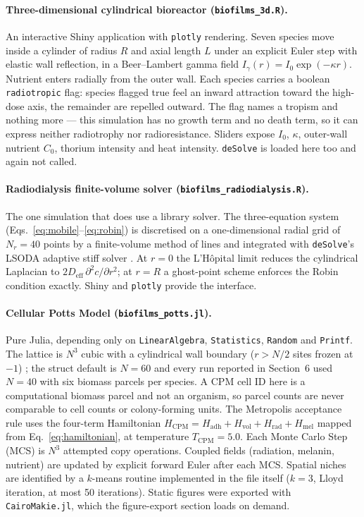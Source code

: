 \documentclass[11pt]{article}
\begin{document}
\paragraph{Three-dimensional cylindrical bioreactor (\texttt{biofilms\_3d.R}).}
An interactive Shiny application with \texttt{plotly} rendering. Seven species move inside a
cylinder of radius $R$ and axial length $L$ under an explicit Euler step with elastic wall
reflection, in a Beer--Lambert gamma field $I_\gamma(r) = I_0\exp(-\kappa r)$. Nutrient enters
radially from the outer wall. Each species carries a boolean \texttt{radiotropic} flag: species
flagged true feel an inward attraction toward the high-dose axis, the remainder are repelled
outward. The flag names a tropism and nothing more --- this simulation has no growth term and no
death term, so it can express neither radiotrophy nor radioresistance. Sliders expose $I_0$,
$\kappa$, outer-wall nutrient $C_0$, thorium intensity and heat intensity. \texttt{deSolve} is
loaded here too and again not called.

\paragraph{Radiodialysis finite-volume solver (\texttt{biofilms\_radiodialysis.R}).}
The one simulation that does use a library solver. The three-equation system
(Eqs.~\ref{eq:mobile}--\ref{eq:robin}) is discretised on a one-dimensional radial grid of
$N_r = 40$ points by a finite-volume method of lines and integrated with \texttt{deSolve}'s LSODA
adaptive stiff solver \cite{soetaert2010}. At $r = 0$ the L'H\^{o}pital limit reduces the
cylindrical Laplacian to $2D_{\mathrm{eff}}\,\partial^2 c/\partial r^2$; at $r = R$ a ghost-point
scheme enforces the Robin condition exactly. Shiny and \texttt{plotly} provide the interface.

\paragraph{Cellular Potts Model (\texttt{biofilms\_potts.jl}).}
Pure Julia, depending only on \texttt{LinearAlgebra}, \texttt{Statistics}, \texttt{Random} and
\texttt{Printf}. The lattice is $N^3$ cubic with a cylindrical wall boundary ($r > N/2$ sites
frozen at $-1$) \cite{graner1992}; the struct default is $N = 60$ and every run reported in
Section~6 used $N = 40$ with six biomass parcels per species. A CPM cell ID here is a
computational biomass parcel and not an organism, so parcel counts are never comparable to cell
counts or colony-forming units. The Metropolis acceptance rule uses the
four-term Hamiltonian
$H_{\mathrm{CPM}} = H_{\mathrm{adh}} + H_{\mathrm{vol}} + H_{\mathrm{rad}} + H_{\mathrm{mel}}$
mapped from Eq.~\ref{eq:hamiltonian}, at temperature $T_{\mathrm{CPM}} = 5.0$. Each Monte Carlo
Step (MCS) is $N^3$ attempted copy operations. Coupled fields (radiation, melanin, nutrient) are
updated by explicit forward Euler after each MCS. Spatial niches are identified by a $k$-means
routine implemented in the file itself ($k = 3$, Lloyd iteration, at most 50 iterations). Static
figures were exported with \texttt{CairoMakie.jl}, which the figure-export section loads on demand.
\end{document}
